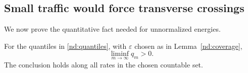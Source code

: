 \subsection{Small traffic would force transverse crossings}

We now prove the quantitative fact needed for unnormalized energies.
\begin{proposition}[Nondegeneration]\label{nd:nondegeneration}
For the quantiles in \eqref{nd:quantiles}, with $\varepsilon$ chosen
as in Lemma~\ref{nd:coverage},
\begin{equation}\label{nd:positive-quantile}
                    \liminf_{m\to\infty}q_m>0.
\end{equation}
The conclusion holds along all rates in the chosen countable set.
\end{proposition}

